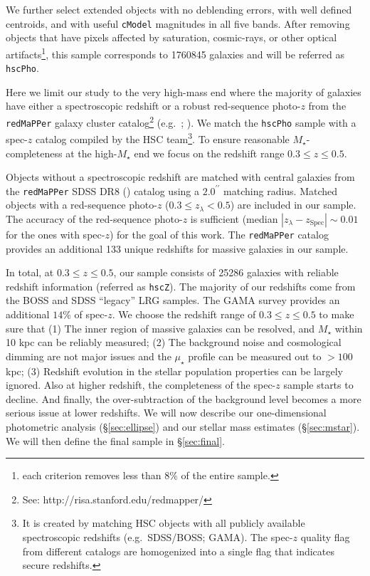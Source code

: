 \documentclass[a4paper,fleqn,usenatbib]{mnras}
\def\arcsec{{\prime\prime}}
\def\redm{\texttt{redMaPPer}}
\def\mstar{{$M_{\star}$}}
\def\mden{{$\mu_{\star}$}}
\begin{document}
    We further select extended objects with no deblending errors, with well defined 
    centroids, and with useful \texttt{cModel} magnitudes in all five bands. 
    After removing objects that have pixels affected by saturation, cosmic-rays, or 
    other optical artifacts\footnote{each criterion removes less than 8\% of the 
    entire sample.}, this sample corresponds to 1760845 galaxies and will be referred 
    as \texttt{hscPho}. 
        
    Here we limit our study to the very high-mass end where the majority of galaxies 
    have either a spectroscopic redshift or a robust red-sequence photo-$z$ from the 
    \redm{} galaxy cluster catalog\footnote{See: http://risa.stanford.edu/redmapper/} 
    (e.g.\ \citealt{Rykoff2014}; \citealt{Rozo2015b}).  
    We match the \texttt{hscPho} sample with a spec-$z$ catalog compiled by the HSC 
    team\footnote{It is created by matching HSC objects with all publicly available 
    spectroscopic redshifts (e.g.\ SDSS/BOSS; GAMA). 
    The spec-$z$ quality flag from different catalogs are homogenized into a single 
    flag that indicates secure redshifts.}.  
    To ensure reasonable \mstar{}-completeness at the high-\mstar{} end we focus on
    the redshift range $0.3 \leq z \leq 0.5$. 
   
    Objects without a spectroscopic redshift are matched with central 
    galaxies from the \redm{} SDSS DR8 (\citealt{SDSSDR8}) catalog using a $2.0^{\arcsec}$ matching radius. Matched objects with a red-sequence photo-$z$ ($0.3 \leq z_{\lambda} < 0.5$) are included in our sample. The accuracy of the red-sequence photo-$z$ is sufficient (median 
    $|z_{\lambda} - z_{\mathrm{Spec}}| {\sim} 0.01$ for the ones with spec-$z$) 
    for the goal of this work.
    The \redm{} catalog provides an additional 133 unique redshifts for massive 
    galaxies in our sample.
        
    In total, at $0.3 \leq z \leq 0.5$, our sample consists of 25286 galaxies with 
    reliable redshift information (referred as \texttt{hscZ}).
    The majority of our redshifts come from the BOSS and SDSS ``legacy'' LRG samples. The GAMA survey provides an additional $14$\% of spec-$z$.
    We choose the redshift range of $0.3 \leq z \leq 0.5$ to make sure that 
    (1) The inner region of massive galaxies can be resolved, and \mstar{} within 
    10 kpc can be reliably measured; 
    (2) The background noise and cosmological dimming are not major issues and the 
    \mden{} profile can be measured out to $>100$ kpc; 
    (3) Redshift evolution in the stellar population properties can be largely 
    ignored.  
    Also at higher redshift, the completeness of the spec-$z$ sample starts to decline. And finally, the over-subtraction of the background level becomes a more serious issue at lower redshifts.  We will now describe our one-dimensional photometric analysis  (\S \ref{sec:ellipse}) and our stellar mass estimates (\S \ref{sec:mstar}). We will then define the final sample in \S \ref{sec:final}.
    
\end{document}
